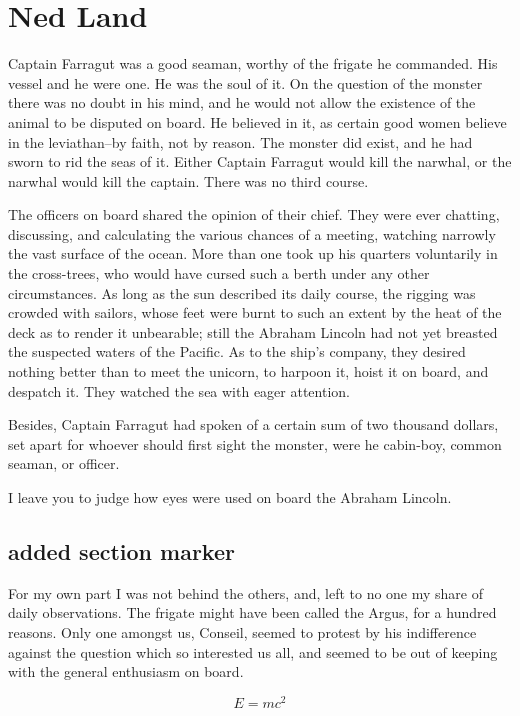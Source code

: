 \chapter{Ned Land}

Captain Farragut was a good seaman, worthy of the frigate he commanded.
His vessel and he were one.  He was the soul of it.  On the question
of the monster there was no doubt in his mind, and he would not allow
the existence of the animal to be disputed on board.  He believed in it,
as certain good women believe in the leviathan--by faith, not by reason.
The monster did exist, and he had sworn to rid the seas of it.  Either Captain
Farragut would kill the narwhal, or the narwhal would kill the captain.
There was no third course.

The officers on board shared the opinion of their chief.
They were ever chatting, discussing, and calculating the various
chances of a meeting, watching narrowly the vast surface of the ocean.
More than one took up his quarters voluntarily in the cross-trees,
who would have cursed such a berth under any other circumstances.
As long as the sun described its daily course, the rigging was
crowded with sailors, whose feet were burnt to such an extent by
the heat of the deck as to render it unbearable; still the Abraham
Lincoln had not yet breasted the suspected waters of the Pacific.
As to the ship's company, they desired nothing better than to meet
the unicorn, to harpoon it, hoist it on board, and despatch it.
They watched the sea with eager attention.

Besides, Captain Farragut had spoken of a certain sum of two thousand dollars,
set apart for whoever should first sight the monster, were he cabin-boy,
common seaman, or officer.

I leave you to judge how eyes were used on board the Abraham Lincoln.

\section{added section marker}

For my own part I was not behind the others, and, left to no one my share
of daily observations.  The frigate might have been called the Argus,
for a hundred reasons.  Only one amongst us, Conseil, seemed to protest
by his indifference against the question which so interested us all,
and seemed to be out of keeping with the general enthusiasm on board.

\begin{equation}
E=mc^2
\end{equation}

